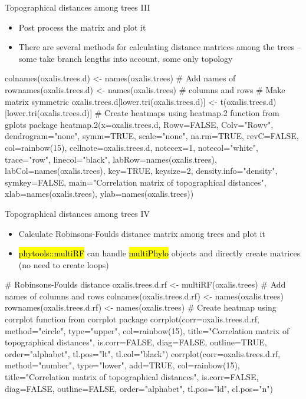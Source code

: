 \documentclass[compress, ucs, xelatex, 11pt, xcolor=svgnames,
  hyperref={
    bookmarks=true,
    unicode=true,
    colorlinks=true,
    pdftitle={Molecular data in R},
    plainpages=false,
    pdfauthor={Vojtech Zeisek},
    pdfsubject={Course about phylogeny and evolution in R},
    pdfcreator={XeLaTeX},
    pdfkeywords={R, evolution, phylogeny, molecular data},
    linkcolor=Tomato,
    anchorcolor=SaddleBrown,
    citecolor=Goldenrod,
    filecolor=DarkMagenta,
    menucolor=Sienna,
    urlcolor=DarkTurquoise,
    pdftex},
  url={hyphens, lowtilde} %
  ]{beamer}
\renewcommand{\texttt}[1]{\hl{\ttfamily #1}}
\begin{document}
\begin{frame}[fragile]{Topographical distances among trees III}
  \begin{itemize}
    \item Post process the matrix and plot it
    \item There are several methods for calculating distance matrices among the trees -- some take branch lengths into account, some only topology
  \end{itemize}
  \begin{spluscode}
    colnames(oxalis.trees.d) <- names(oxalis.trees) # Add names of
    rownames(oxalis.trees.d) <- names(oxalis.trees) # columns and rows
    # Make matrix symmetric
    oxalis.trees.d[lower.tri(oxalis.trees.d)] <-
      t(oxalis.trees.d)[lower.tri(oxalis.trees.d)]
    # Create heatmaps using heatmap.2 function from gplots package
    heatmap.2(x=oxalis.trees.d, Rowv=FALSE, Colv="Rowv", dendrogram="none",
      symm=TRUE, scale="none", na.rm=TRUE, revC=FALSE, col=rainbow(15),
      cellnote=oxalis.trees.d, notecex=1, notecol="white", trace="row",
      linecol="black", labRow=names(oxalis.trees),
      labCol=names(oxalis.trees), key=TRUE, keysize=2,
      density.info="density", symkey=FALSE, main="Correlation matrix of
      topographical distances", xlab=names(oxalis.trees),
      ylab=names(oxalis.trees))
  \end{spluscode}
\end{frame}

\begin{frame}[fragile]{Topographical distances among trees IV}
\begin{itemize}
  \item Calculate Robinsons-Foulds distance matrix among trees and plot it
  \item \texttt{phytools::multiRF} can handle \texttt{multiPhylo} objects and directly create matrices (no need to create loops)
\end{itemize}
  \begin{spluscode}
    # Robinsons-Foulds distance
    oxalis.trees.d.rf <- multiRF(oxalis.trees)
    # Add names of columns and rows
    colnames(oxalis.trees.d.rf) <- names(oxalis.trees)
    rownames(oxalis.trees.d.rf) <- names(oxalis.trees)
    # Create heatmap using corrplot function from corrplot package
    corrplot(corr=oxalis.trees.d.rf, method="circle", type="upper",
      col=rainbow(15), title="Correlation matrix of topographical
      distances", is.corr=FALSE, diag=FALSE, outline=TRUE,
      order="alphabet", tl.pos="lt", tl.col="black")
    corrplot(corr=oxalis.trees.d.rf, method="number", type="lower",
      add=TRUE, col=rainbow(15), title="Correlation matrix of
      topographical distances", is.corr=FALSE, diag=FALSE,
      outline=FALSE, order="alphabet", tl.pos="ld", cl.pos="n")
  \end{spluscode}
\end{frame}
\end{document}
